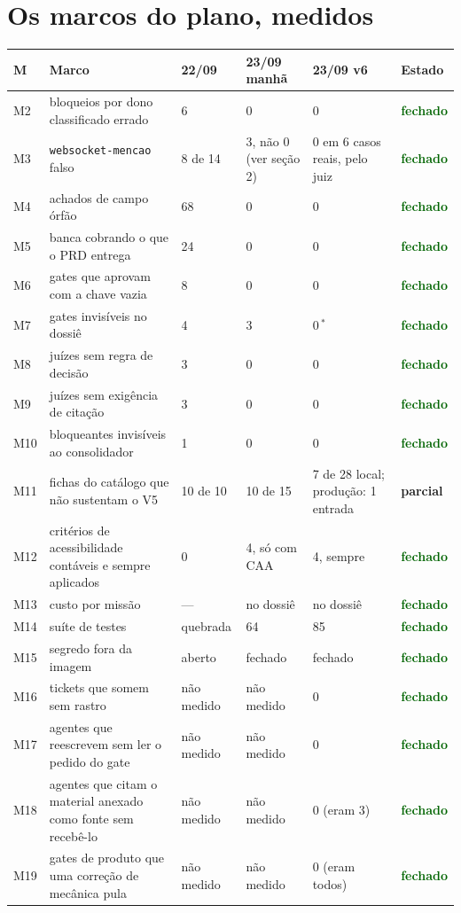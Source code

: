 \documentclass[11pt,a4paper]{article}
\newcommand{\ok}{\textcolor{DarkGreen}{\textbf{fechado}}}
\newcommand{\parcial}{\textcolor{DarkYellow}{\textbf{parcial}}}
\begin{document}
\section{Os marcos do plano, medidos}

\small
\begin{longtable}{@{}p{0.8cm} p{5.5cm} p{1.9cm} p{2.1cm} p{2.7cm} p{1.4cm}@{}}
\toprule
\textbf{M} & \textbf{Marco} & \textbf{22/09} & \textbf{23/09 manhã} & \textbf{23/09 v6} & \textbf{Estado} \\
\midrule
\endhead
\bottomrule
\endfoot
M2 & bloqueios por dono classificado errado & 6 & 0 & 0 & \ok \\
M3 & \texttt{websocket-mencao} falso & 8 de 14 & 3, não 0 (ver seção 2) & 0 em 6 casos reais, pelo juiz & \ok \\
M4 & achados de campo órfão & 68 & 0 & 0 & \ok \\
M5 & banca cobrando o que o PRD entrega & 24 & 0 & 0 & \ok \\
M6 & gates que aprovam com a chave vazia & 8 & 0 & 0 & \ok \\
M7 & gates invisíveis no dossiê & 4 & 3 & 0\,$^*$ & \ok \\
M8 & juízes sem regra de decisão & 3 & 0 & 0 & \ok \\
M9 & juízes sem exigência de citação & 3 & 0 & 0 & \ok \\
M10 & bloqueantes invisíveis ao consolidador & 1 & 0 & 0 & \ok \\
M11 & fichas do catálogo que não sustentam o V5 & 10 de 10 & 10 de 15 & 7 de 28 local; produção: 1 entrada & \parcial \\
M12 & critérios de acessibilidade contáveis e sempre aplicados & 0 & 4, só com CAA & 4, sempre & \ok \\
M13 & custo por missão & --- & no dossiê & no dossiê & \ok \\
M14 & suíte de testes & quebrada & 64 & 85 & \ok \\
M15 & segredo fora da imagem & aberto & fechado & fechado & \ok \\
M16 & tickets que somem sem rastro & não medido & não medido & 0 & \ok \\
M17 & agentes que reescrevem sem ler o pedido do gate & não medido & não medido & 0 & \ok \\
M18 & agentes que citam o material anexado como fonte sem recebê-lo & não medido & não medido & 0 (eram 3) & \ok \\
M19 & gates de produto que uma correção de mecânica pula & não medido & não medido & 0 (eram todos) & \ok \\

\end{longtable}
\end{document}
